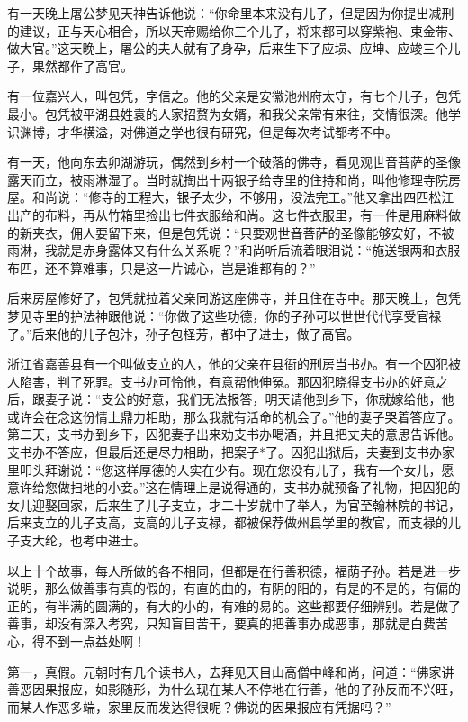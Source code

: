 \documentclass[12pt,UTF8]{ctexbook}
\begin{document}
有一天晚上屠公梦见天神告诉他说：“你命里本来没有儿子，但是因为你提出减刑的建议，正与天心相合，所以天帝赐给你三个儿子，将来都可以穿紫袍、束金带、做大官。”这天晚上，屠公的夫人就有了身孕，后来生下了应埙、应坤、应竣三个儿子，果然都作了高官。

有一位嘉兴人，叫包凭，字信之。他的父亲是安徽池州府太守，有七个儿子，包凭最小。包凭被平湖县姓袁的人家招赘为女婿，和我父亲常有来往，交情很深。他学识渊博，才华横溢，对佛道之学也很有研究，但是每次考试都考不中。

有一天，他向东去卯湖游玩，偶然到乡村一个破落的佛寺，看见观世音菩萨的圣像露天而立，被雨淋湿了。当时就掏出十两银子给寺里的住持和尚，叫他修理寺院房屋。和尚说：“修寺的工程大，银子太少，不够用，没法完工。”他又拿出四匹松江出产的布料，再从竹箱里捡出七件衣服给和尚。这七件衣服里，有一件是用麻料做的新夹衣，佣人要留下来，但是包凭说：“只要观世音菩萨的圣像能够安好，不被雨淋，我就是赤身露体又有什么关系呢？”和尚听后流着眼泪说：“施送银两和衣服布匹，还不算难事，只是这一片诚心，岂是谁都有的？”

后来房屋修好了，包凭就拉着父亲同游这座佛寺，并且住在寺中。那天晚上，包凭梦见寺里的护法神跟他说：“你做了这些功德，你的子孙可以世世代代享受官禄了。”后来他的儿子包汴，孙子包柽芳，都中了进士，做了高官。

浙江省嘉善县有一个叫做支立的人，他的父亲在县衙的刑房当书办。有一个囚犯被人陷害，判了死罪。支书办可怜他，有意帮他伸冤。那囚犯晓得支书办的好意之后，跟妻子说：“支公的好意，我们无法报答，明天请他到乡下，你就嫁给他，他或许会在念这份情上鼎力相助，那么我就有活命的机会了。”他的妻子哭着答应了。第二天，支书办到乡下，囚犯妻子出来劝支书办喝酒，并且把丈夫的意思告诉他。支书办不答应，但最后还是尽力相助，把案子*了。囚犯出狱后，夫妻到支书办家里叩头拜谢说：“您这样厚德的人实在少有。现在您没有儿子，我有一个女儿，愿意许给您做扫地的小妾。”这在情理上是说得通的，支书办就预备了礼物，把囚犯的女儿迎娶回家，后来生了儿子支立，才二十岁就中了举人，为官至翰林院的书记，后来支立的儿子支高，支高的儿子支禄，都被保荐做州县学里的教官，而支禄的儿子支大纶，也考中进士。

以上十个故事，每人所做的各不相同，但都是在行善积德，福荫子孙。若是进一步说明，那么做善事有真的假的，有直的曲的，有阴的阳的，有是的不是的，有偏的正的，有半满的圆满的，有大的小的，有难的易的。这些都要仔细辨别。若是做了善事，却没有深入考究，只知盲目苦干，要真的把善事办成恶事，那就是白费苦心，得不到一点益处啊！

第一，真假。元朝时有几个读书人，去拜见天目山高僧中峰和尚，问道：“佛家讲善恶因果报应，如影随形，为什么现在某人不停地在行善，他的子孙反而不兴旺，而某人作恶多端，家里反而发达得很呢？佛说的因果报应有凭据吗？”
\end{document}
